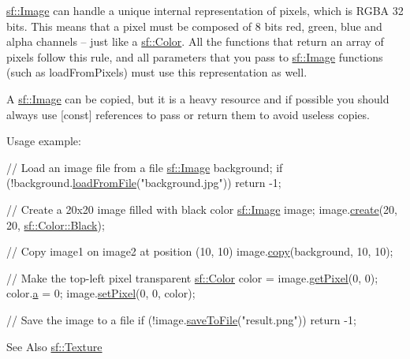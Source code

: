 \hyperlink{classsf_1_1Image}{sf\-::\-Image} can handle a unique internal representation of pixels, which is R\-G\-B\-A 32 bits. This means that a pixel must be composed of 8 bits red, green, blue and alpha channels -- just like a \hyperlink{classsf_1_1Color}{sf\-::\-Color}. All the functions that return an array of pixels follow this rule, and all parameters that you pass to \hyperlink{classsf_1_1Image}{sf\-::\-Image} functions (such as load\-From\-Pixels) must use this representation as well.

A \hyperlink{classsf_1_1Image}{sf\-::\-Image} can be copied, but it is a heavy resource and if possible you should always use \mbox{[}const\mbox{]} references to pass or return them to avoid useless copies.

Usage example\-: 
\begin{DoxyCode}
\textcolor{comment}{// Load an image file from a file}
\hyperlink{classsf_1_1Image}{sf::Image} background;
\textcolor{keywordflow}{if} (!background.\hyperlink{classsf_1_1Image_a9e4f2aa8e36d0cabde5ed5a4ef80290b}{loadFromFile}(\textcolor{stringliteral}{"background.jpg"}))
    \textcolor{keywordflow}{return} -1;

\textcolor{comment}{// Create a 20x20 image filled with black color}
\hyperlink{classsf_1_1Image}{sf::Image} image;
image.\hyperlink{classsf_1_1Image_a2a67930e2fd9ad97cf004e918cf5832b}{create}(20, 20, \hyperlink{classsf_1_1Color_a77c688197b981338f0b19dc58bd2facd}{sf::Color::Black});

\textcolor{comment}{// Copy image1 on image2 at position (10, 10)}
image.\hyperlink{classsf_1_1Image_ab2fa337c956f85f93377dcb52153a45a}{copy}(background, 10, 10);

\textcolor{comment}{// Make the top-left pixel transparent}
\hyperlink{classsf_1_1Color}{sf::Color} color = image.\hyperlink{classsf_1_1Image_a8c8460e311dcb00557cb00a81c29163d}{getPixel}(0, 0);
color.\hyperlink{classsf_1_1Color_a56dbdb47d5f040d9b78ac6a0b8b3a831}{a} = 0;
image.\hyperlink{classsf_1_1Image_a9fd329b8cd7d4439e07fb5d3bb2d9744}{setPixel}(0, 0, color);

\textcolor{comment}{// Save the image to a file}
\textcolor{keywordflow}{if} (!image.\hyperlink{classsf_1_1Image_aec0ed16b67df7b512aaa5c53388ba14e}{saveToFile}(\textcolor{stringliteral}{"result.png"}))
    \textcolor{keywordflow}{return} -1;
\end{DoxyCode}


\begin{DoxySeeAlso}{See Also}
\hyperlink{classsf_1_1Texture}{sf\-::\-Texture} 
\end{DoxySeeAlso}


